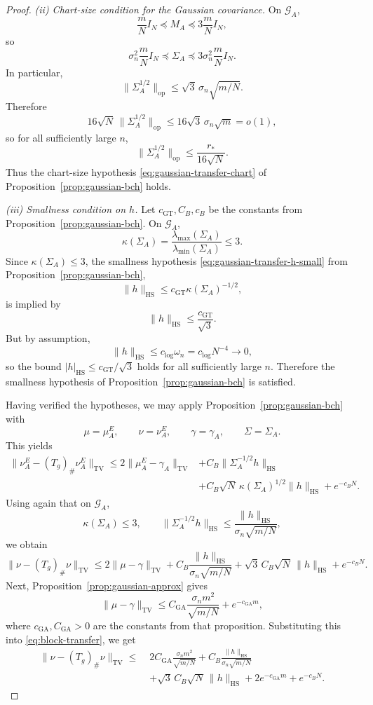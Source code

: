 \documentclass[11pt, reqno]{amsart}
\numberwithin{equation}{section}
\theoremstyle{remark}
\newcommand{\1}{\mathbf{1}}
\newcommand{\HS}{\mathrm{HS}}
\newcommand{\op}{\mathrm{op}}
\newcommand{\TV}{\mathrm{TV}}
\begin{document}
\begin{proof}
\smallskip
\noindent
\emph{(ii) Chart-size condition for the Gaussian covariance.}
On $\mathcal G_A$,
\[
\frac{m}{N}I_N\preceq M_A\preceq 3\frac{m}{N}I_N,
\]
so
\[
\sigma_n^2\frac{m}{N}I_N
\preceq
\Sigma_A
\preceq
3\sigma_n^2\frac{m}{N}I_N.
\]
In particular,
\[
\|\Sigma_A^{1/2}\|_{\op}
\le
\sqrt3\,\sigma_n\sqrt{m/N}.
\]
Therefore
\[
16\sqrt N\,\|\Sigma_A^{1/2}\|_{\op}
\le
16\sqrt3\,\sigma_n\sqrt m
=o(1),
\]
so for all sufficiently large $n$,
\[
\|\Sigma_A^{1/2}\|_{\op}\le \frac{r_\ast}{16\sqrt N}.
\]
Thus the chart-size hypothesis \eqref{eq:gaussian-transfer-chart} of
Proposition~\ref{prop:gaussian-bch} holds.

\smallskip
\noindent
\emph{(iii) Smallness condition on $h$.}
Let $c_{\mathrm{GT}},C_B,c_B$ be the constants from
Proposition~\ref{prop:gaussian-bch}. On $\mathcal G_A$,
\[
\kappa(\Sigma_A)
=
\frac{\lambda_{\max}(\Sigma_A)}{\lambda_{\min}(\Sigma_A)}
\le 3.
\]
Since $\kappa(\Sigma_A)\le 3$,
the smallness hypothesis \eqref{eq:gaussian-transfer-h-small} from
Proposition~\ref{prop:gaussian-bch},
\[
\|h\|_{\HS}\le c_{\mathrm{GT}}\kappa(\Sigma_A)^{-1/2},
\]
is implied by
\[
\|h\|_{\HS}\le \frac{c_{\mathrm{GT}}}{\sqrt3}.
\]
But by assumption,
\[
\|h\|_{\HS}\le c_{\log}\omega_n=c_{\log}N^{-4}\to 0,
\]
so the bound $|h|_{\HS}\le c_{\mathrm{GT}}/\sqrt3$ holds for all sufficiently large $n$. Therefore the smallness hypothesis of Proposition~\ref{prop:gaussian-bch} is satisfied.

Having verified the hypotheses, we may apply
Proposition~\ref{prop:gaussian-bch} with
\[
\mu=\mu_A^E,\qquad
\nu=\nu_A^E,\qquad
\gamma=\gamma_A,\qquad
\Sigma=\Sigma_A.
\]
This yields
\begin{align*}
\|\nu_A^E-(T_g)_\#\nu_A^E\|_{\TV}
\le
2\|\mu_A^E-\gamma_A\|_{\TV}
&+
C_B\|\Sigma_A^{-1/2}h\|_{\HS} \\
&+
C_B\sqrt N\,\kappa(\Sigma_A)^{1/2}\|h\|_{\HS}
+
e^{-c_BN}.
\end{align*}
Using again that on \(\mathcal G_A\),
\[
\kappa(\Sigma_A)\le 3,
\qquad
\|\Sigma_A^{-1/2}h\|_{\HS}
\le
\frac{\|h\|_{\HS}}{\sigma_n\sqrt{m/N}},
\]
we obtain
\begin{equation}
\label{eq:block-transfer}
\|\nu-(T_g)_\#\nu\|_{\TV}
\le
2\|\mu-\gamma\|_{\TV}
+
C_B\frac{\|h\|_{\HS}}{\sigma_n\sqrt{m/N}}
+
\sqrt3\,C_B\sqrt N\,\|h\|_{\HS}
+
e^{-c_BN}.
\end{equation}
Next, Proposition~\ref{prop:gaussian-approx} gives
\[
\|\mu-\gamma\|_{\TV}
\le
C_{\mathrm{GA}}\frac{\sigma_n m^2}{\sqrt{m/N}}
+
e^{-c_{\mathrm{GA}}m},
\]
where \(c_{\mathrm{GA}},C_{\mathrm{GA}}>0\) are the constants from that proposition.
Substituting this into \eqref{eq:block-transfer}, we get
\begin{align*}
\|\nu-(T_g)_\#\nu\|_{\TV}
\le\;&
2C_{\mathrm{GA}}\frac{\sigma_n m^2}{\sqrt{m/N}}
+
C_B\frac{\|h\|_{\HS}}{\sigma_n\sqrt{m/N}}\\
&+
\sqrt3\,C_B\sqrt N\,\|h\|_{\HS}
+
2e^{-c_{\mathrm{GA}}m}
+
e^{-c_BN}.
\end{align*}


\end{proof}
\end{document}
